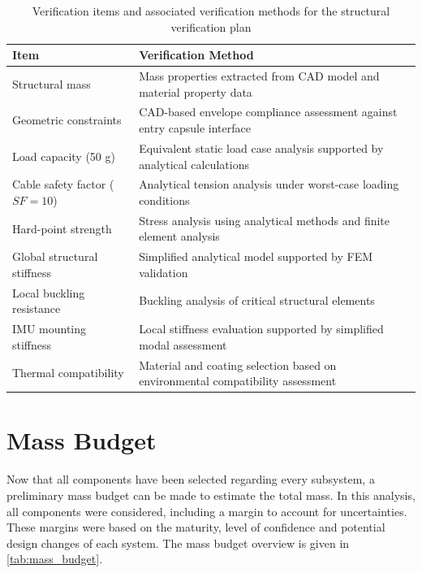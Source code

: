 \begin{table}[H]
\centering
\caption{Verification items and associated verification methods for the structural verification plan}
\label{tab:struc_vnv}
\begin{tabular}{ll}
\hline
\textbf{Item} & \textbf{Verification Method} \\
\hline
Structural mass & Mass properties extracted from CAD model and material property data \\
Geometric constraints & CAD-based envelope compliance assessment against entry capsule interface \\
Load capacity (50 g) & Equivalent static load case analysis supported by analytical calculations \\
Cable safety factor ($SF=10$) & Analytical tension analysis under worst-case loading conditions \\
Hard-point strength & Stress analysis using analytical methods and finite element analysis \\
Global structural stiffness & Simplified analytical model supported by FEM validation \\
Local buckling resistance & Buckling analysis of critical structural elements \\
IMU mounting stiffness & Local stiffness evaluation supported by simplified modal assessment \\
Thermal compatibility & Material and coating selection based on environmental compatibility assessment \\
\hline
\end{tabular}
\end{table}

\section{Mass Budget}
Now that all components have been selected regarding every subsystem, a preliminary mass budget can be made to estimate the total mass. In this analysis, all components were considered, including a margin to account for uncertainties. These margins were based on the maturity, level of confidence and potential design changes of each system. The mass budget overview is given in \autoref{tab:mass_budget}.

